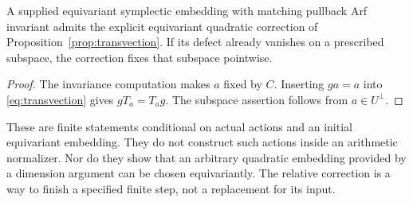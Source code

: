 \begin{corollary}\label{cor:equiv}
A supplied equivariant symplectic embedding with matching pullback Arf invariant admits the explicit equivariant quadratic correction of Proposition~\ref{prop:transvection}. If its defect already vanishes on a prescribed subspace, the correction fixes that subspace pointwise.
\end{corollary}
\begin{proof}
The invariance computation makes $a$ fixed by $C$. Inserting $ga=a$ into \eqref{eq:transvection} gives $gT_a=T_ag$. The subspace assertion follows from $a\in U^\perp$.
\end{proof}

These are finite statements conditional on actual actions and an initial equivariant embedding. They do not construct such actions inside an arithmetic normalizer. Nor do they show that an arbitrary quadratic embedding provided by a dimension argument can be chosen equivariantly. The relative correction is a way to finish a specified finite step, not a replacement for its input.

